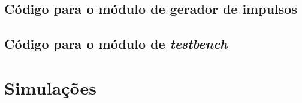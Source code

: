 \documentclass[10pt]{article}
\begin{document}
\subsection{Código para o módulo de gerador de impulsos}



\vspace{1cm}

\subsection{Código para o módulo de \textit{testbench}}



\section{Simulações}



\end{document}
